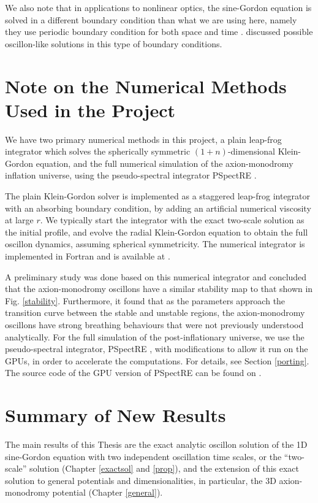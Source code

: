 \documentclass[11pt]{book}
\begin{document}
We also note that in applications to nonlinear optics, the sine-Gordon equation is solved in a different boundary condition than what we are using here, namely they use periodic boundary condition for both space and time \cite{JAWORSKI1982427, 0305-4470-15-10-015}. \cite{JAWORSKI1982427, 0305-4470-15-10-015} discussed possible oscillon-like solutions in this type of boundary conditions.

\section{Note on the Numerical Methods Used in the Project}\label{intro:num}
We have two primary numerical methods in this project, a plain leap-frog integrator which solves the spherically symmetric $(1+n)$-dimensional Klein-Gordon equation, and the full numerical simulation of the axion-monodromy inflation universe, using the pseudo-spectral integrator PSpectRE \cite{Easther:2010qz}.

The plain Klein-Gordon solver is implemented as a staggered leap-frog integrator with an absorbing boundary condition, by adding an artificial numerical viscosity at large $r$. We typically start the integrator with the exact two-scale solution as the initial profile, and evolve the radial Klein-Gordon equation to obtain the full oscillon dynamics, assuming spherical symmetricity. The numerical integrator is implemented in Fortran and is available at \cite{fortrancode}.

A preliminary study \cite{josh} was done based on this numerical integrator and concluded that the axion-monodromy oscillons have a similar stability map to that shown in Fig. \ref{stability}. Furthermore, it found that as the parameters approach the transition curve between the stable and unstable regions, the axion-monodromy oscillons have strong breathing behaviours that were not previously understood analytically.
\medbreak
For the full simulation of the post-inflationary universe, we use the pseudo-spectral integrator, PSpectRE \cite{Easther:2010qz}, with modifications to allow it run on the GPUs, in order to accelerate the computations. For details, see Section \ref{porting}. The source code of the GPU version of PSpectRE can be found on \cite{cudaport}.

\section{Summary of New Results}
The main results of this Thesis are the exact analytic oscillon solution of the 1D sine-Gordon equation with two independent oscillation time scales, or the ``two-scale'' solution (Chapter \ref{exactsol} and \ref{prop}), and the extension of this exact solution to general potentials and dimensionalities, in particular, the 3D axion-monodromy potential (Chapter \ref{general}).
\end{document}
